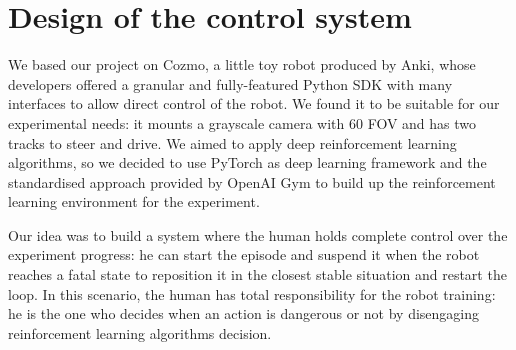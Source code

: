 \documentclass[10pt,twocolumn,letterpaper]{article}
\begin{document}

\section{Design of the control system}

We based our project on Cozmo, a little toy robot produced by Anki, whose developers offered a granular and fully-featured Python SDK with many interfaces to allow direct control of the robot.
We found it to be suitable for our experimental needs: it mounts a grayscale camera with 60 FOV and has two tracks to steer and drive.
We aimed to apply deep reinforcement learning algorithms, so we decided to use PyTorch as deep learning framework and the standardised approach provided by OpenAI Gym to build up the reinforcement learning environment for the experiment.

Our idea was to build a system where the human holds complete control over the experiment progress: he can start the episode and suspend it when the robot reaches a fatal state to reposition it in the closest stable situation and restart the loop.
In this scenario, the human has total responsibility for the robot training: he is the one who decides when an action is dangerous or not by disengaging reinforcement learning algorithms decision.
\end{document}
